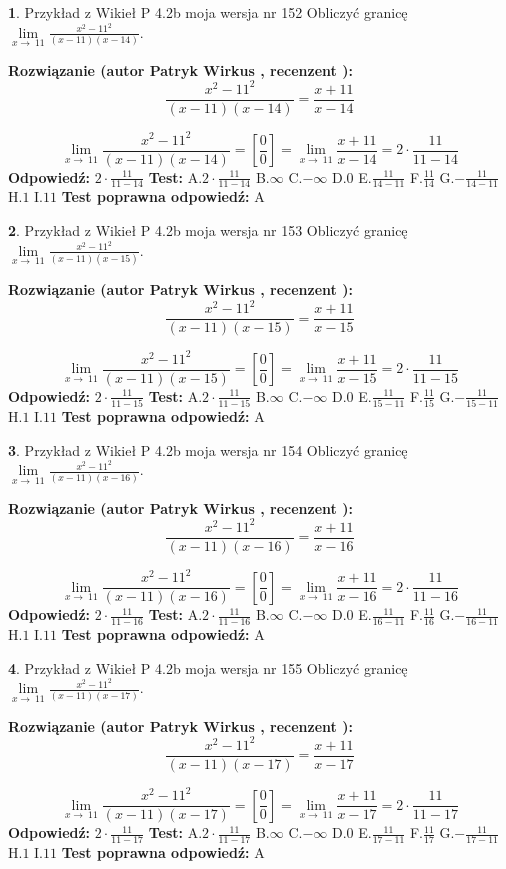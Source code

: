 \documentclass[12pt, a4paper]{article}
\theoremstyle{definition} %
\newtheorem{zad}{}
\newcommand{\zadStart}[1]{\begin{zad}#1\newline}
\newcommand{\zadStop}{\end{zad}}
\newcommand{\rozwStart}[2]{\noindent \textbf{Rozwiązanie (autor #1 , recenzent #2): }\newline}
\newcommand{\rozwStop}{\newline}
\newcommand{\odpStart}{\noindent \textbf{Odpowiedź:}\newline}
\newcommand{\odpStop}{\newline}
\newcommand{\testStart}{\noindent \textbf{Test:}\newline}
\newcommand{\testStop}{\newline}
\newcommand{\kluczStart}{\noindent \textbf{Test poprawna odpowiedź:}\newline}
\newcommand{\kluczStop}{\newline}
\begin{document}
\zadStart{Przykład z Wikieł P 4.2b moja wersja nr 152}
Obliczyć granicę $\lim\limits_{x\to\ 11}\frac{x^{2}-11^{2}}{(x-11)(x-14)}$.
\zadStop
\rozwStart{Patryk Wirkus}{}
$$\frac{x^{2}-11^{2}}{(x-11)(x-14)}=\frac{x+11}{x-14}$$

$$\lim\limits_{x\to\ 11}\frac{x^{2}-11^{2}}{(x-11)(x-14)}=[\frac{0}{0}]=\lim\limits_{x\to\ 11}\frac{x+11}{x-14}=2 \cdot \frac{11}{11-14}$$
\rozwStop
\odpStart
$2 \cdot \frac{11}{11-14}$
\odpStop
\testStart
A.$2 \cdot \frac{11}{11-14}$
B.$\infty$
C.$-\infty$
D.$0$
E.$\frac{11}{14-11}$
F.$\frac{11}{14}$
G.$-\frac{11}{14-11}$
H.$1$
I.$11$
\testStop
\kluczStart
A
\kluczStop



\zadStart{Przykład z Wikieł P 4.2b moja wersja nr 153}
Obliczyć granicę $\lim\limits_{x\to\ 11}\frac{x^{2}-11^{2}}{(x-11)(x-15)}$.
\zadStop
\rozwStart{Patryk Wirkus}{}
$$\frac{x^{2}-11^{2}}{(x-11)(x-15)}=\frac{x+11}{x-15}$$

$$\lim\limits_{x\to\ 11}\frac{x^{2}-11^{2}}{(x-11)(x-15)}=[\frac{0}{0}]=\lim\limits_{x\to\ 11}\frac{x+11}{x-15}=2 \cdot \frac{11}{11-15}$$
\rozwStop
\odpStart
$2 \cdot \frac{11}{11-15}$
\odpStop
\testStart
A.$2 \cdot \frac{11}{11-15}$
B.$\infty$
C.$-\infty$
D.$0$
E.$\frac{11}{15-11}$
F.$\frac{11}{15}$
G.$-\frac{11}{15-11}$
H.$1$
I.$11$
\testStop
\kluczStart
A
\kluczStop



\zadStart{Przykład z Wikieł P 4.2b moja wersja nr 154}
Obliczyć granicę $\lim\limits_{x\to\ 11}\frac{x^{2}-11^{2}}{(x-11)(x-16)}$.
\zadStop
\rozwStart{Patryk Wirkus}{}
$$\frac{x^{2}-11^{2}}{(x-11)(x-16)}=\frac{x+11}{x-16}$$

$$\lim\limits_{x\to\ 11}\frac{x^{2}-11^{2}}{(x-11)(x-16)}=[\frac{0}{0}]=\lim\limits_{x\to\ 11}\frac{x+11}{x-16}=2 \cdot \frac{11}{11-16}$$
\rozwStop
\odpStart
$2 \cdot \frac{11}{11-16}$
\odpStop
\testStart
A.$2 \cdot \frac{11}{11-16}$
B.$\infty$
C.$-\infty$
D.$0$
E.$\frac{11}{16-11}$
F.$\frac{11}{16}$
G.$-\frac{11}{16-11}$
H.$1$
I.$11$
\testStop
\kluczStart
A
\kluczStop



\zadStart{Przykład z Wikieł P 4.2b moja wersja nr 155}
Obliczyć granicę $\lim\limits_{x\to\ 11}\frac{x^{2}-11^{2}}{(x-11)(x-17)}$.
\zadStop
\rozwStart{Patryk Wirkus}{}
$$\frac{x^{2}-11^{2}}{(x-11)(x-17)}=\frac{x+11}{x-17}$$

$$\lim\limits_{x\to\ 11}\frac{x^{2}-11^{2}}{(x-11)(x-17)}=[\frac{0}{0}]=\lim\limits_{x\to\ 11}\frac{x+11}{x-17}=2 \cdot \frac{11}{11-17}$$
\rozwStop
\odpStart
$2 \cdot \frac{11}{11-17}$
\odpStop
\testStart
A.$2 \cdot \frac{11}{11-17}$
B.$\infty$
C.$-\infty$
D.$0$
E.$\frac{11}{17-11}$
F.$\frac{11}{17}$
G.$-\frac{11}{17-11}$
H.$1$
I.$11$
\testStop
\kluczStart
A
\kluczStop
\end{document}
